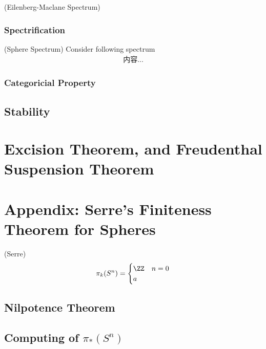 \documentclass[Total.tex]{subfiles}
\begin{document}
				\begin{example}
					(Eilenberg-Maclane Spectrum)
				\end{example}
				
			\subsection{Spectrification}
				\begin{example}
					(Sphere Spectrum) Consider following spectrum
					\begin{gather*}
						内容...
					\end{gather*}
				\end{example}
			
			\subsection{Categoricial Property}
			
		\section{Stability}
	\chapter{Excision Theorem, and Freudenthal Suspension Theorem}
	\chapter{Appendix: Serre's Finiteness Theorem for Spheres}
		\begin{theorem}
			(Serre) 
			\begin{gather*}
				\pi_k(S^n)=\begin{cases}
					\ZZ&n=0\\
					a
				\end{cases}
			\end{gather*}
		\end{theorem}
		
		\section{Nilpotence Theorem}
		
		\section{Computing of $\pi_*(S^n)$	}
\end{document}
